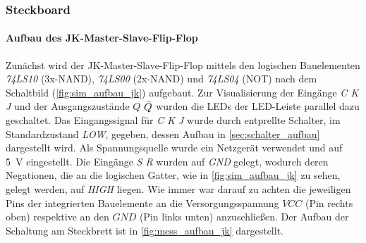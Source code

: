 \documentclass[12pt,english,ngerman]{scrartcl}
\begin{document}
\subsubsection{Steckboard}
\paragraph{Aufbau des JK-Master-Slave-Flip-Flop}\label{sec:mess_cmos}
Zunächst wird der JK-Master-Slave-Flip-Flop mittels den logischen Bauelementen
\textit{74LS10} (3x-NAND), \textit{74LS00} (2x-NAND) und \textit{74LS04} (NOT)
nach dem Schaltbild (\autoref{fig:sim_aufbau_jk})
aufgebaut. Zur Visualisierung der Eingänge \textit{C K J} und der
Ausgangszustände $Q$ $\Bar{Q}$ wurden die LEDs der LED-Leiste parallel dazu geschaltet. Das
Eingangssignal für \textit{C K J} wurde durch entprellte Schalter, im Standardzustand
\textit{LOW}, gegeben, dessen Aufbau in \autoref{sec:schalter_aufbau} dargestellt wird. Als
Spannungsquelle wurde ein Netzgerät verwendet und auf \SI{5}{\volt}
eingestellt. Die Eingänge \textit{S R} wurden auf \textit{GND} gelegt, wodurch deren
Negationen, die an die logischen Gatter, wie in \autoref{fig:sim_aufbau_jk} zu sehen, gelegt werden,
auf \textit{HIGH} liegen. Wie immer war darauf zu achten die jeweiligen Pins der integrierten
Bauelemente an die Versorgungsspannung $VCC$ (Pin rechts oben) respektive 
an den $GND$ (Pin links unten) anzuschließen. 
Der Aufbau der Schaltung am Steckbrett ist in \autoref{fig:mess_aufbau_jk} dargestellt.
\end{document}

